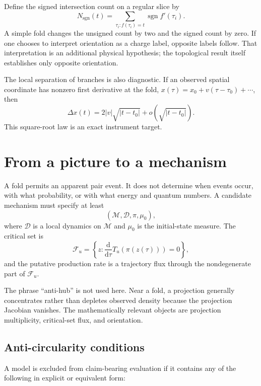 \documentclass[aps,prd,reprint,nofootinbib,longbibliography]{revtex4-2}
\newcommand{\M}{\mathcal{M}}
\newcommand{\F}{\mathcal{F}}
\newcommand{\dd}{\mathrm{d}}
\begin{document}
Define the signed intersection count on a regular slice by
\begin{equation}
  N_{\mathrm{sgn}}(t)
  =\sum_{\tau_i:f(\tau_i)=t}
   \operatorname{sgn} f'(\tau_i).
\end{equation}
A simple fold changes the unsigned count by two and the signed count by zero.  If
one chooses to interpret orientation as a charge label, opposite labels follow.
That interpretation is an additional physical hypothesis; the topological result
itself establishes only opposite orientation.

The local separation of branches is also diagnostic.  If an observed spatial
coordinate has nonzero first derivative at the fold,
$x(\tau)=x_0+v(\tau-\tau_0)+\cdots$, then
\begin{equation}
  \Delta x(t)=2|v|\sqrt{|t-t_0|}+o(\sqrt{|t-t_0|}).
  \label{eq:sqrt}
\end{equation}
This square-root law is an exact instrument target.

\section{From a picture to a mechanism}

A fold permits an apparent pair event.  It does not determine when events occur,
with what probability, or with what energy and quantum numbers.  A candidate
mechanism must specify at least
\begin{equation}
  (\M,\mathcal{D},\pi,\mu_0),
\end{equation}
where $\mathcal{D}$ is a local dynamics on $\M$ and $\mu_0$ is the initial-state
measure.  The critical set is
\begin{equation}
  \F_u=\left\{z:\frac{\dd}{\dd\tau}
  T_u(\pi(z(\tau)))=0\right\},
\end{equation}
and the putative production rate is a trajectory flux through the nondegenerate
part of $\F_u$.

The phrase ``anti-hub'' is not used here.  Near a fold, a projection generally
concentrates rather than depletes observed density because the projection Jacobian
vanishes.  The mathematically relevant objects are projection multiplicity,
critical-set flux, and orientation.

\subsection{Anti-circularity conditions}

A model is excluded from claim-bearing evaluation if it contains any of the
following in explicit or equivalent form:
\end{document}
